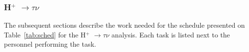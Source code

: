 \documentclass[11pt]{article}
\newcommand{\too}{$\rightarrow$}
\begin{document}
\subsubsection{H$^+$ \too $\tau \nu$}
The subsequent sections describe the work needed for the schedule presented on Table~\ref{tab:sched} for the H$^+$ \too $\tau \nu$ analysis. Each task is listed next to the personnel performing the task.


\end{document}
